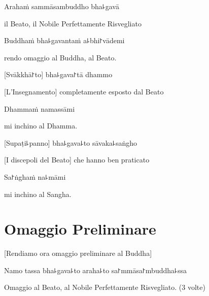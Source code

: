 \clearpage

Arahaṁ sammāsambuddho bha꜕gavā

\begin{english}
il Beato, il Nobile Perfettamente Risvegliato
\end{english}

Buddhaṁ bha꜕gavantaṁ a꜕bhi꜓vādemi

\begin{english}
rendo omaggio al Buddha, al Beato.
\end{english}

[Svākkhā꜓to] bha꜕gava꜓tā dhammo

\begin{english}
[L'Insegnamento] completamente esposto dal Beato
\end{english}

Dhammaṁ namassāmi

\begin{english}
mi inchino al Dhamma.
\end{english}

[Supaṭi꜕panno] bha꜕gava꜕to sāvaka꜕saṅgho

\begin{english}
[I discepoli del Beato] che hanno ben praticato
\end{english}

Sa꜓ṅghaṁ na꜕māmi

\begin{english}
mi inchino al Sangha.
\end{english}

\chapter{Omaggio Preliminare}

\begin{leader}
\end{leader}

\begin{english}
[Rendiamo ora omaggio preliminare al Buddha]
\end{english}

\vspace{\baselineskip}

Namo tassa bha꜕gava꜕to araha꜕to sa꜓mmāsa꜓mbuddha꜕ssa


\begin{english}
Omaggio al Beato, al Nobile Perfettamente Risvegliato. (3 volte)

\end{english}

